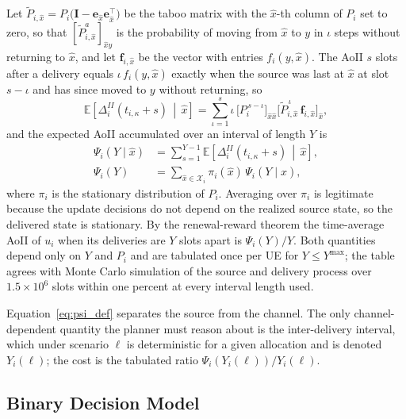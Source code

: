 Let $\tilde{P}_{i,\hat{x}}=P_i\bigl(\mathbf{I}-\mathbf{e}_{\hat{x}}\mathbf{e}_{\hat{x}}^{\top}\bigr)$ be the taboo
matrix with the $\hat{x}$-th column of $P_i$ set to zero, so that $[\tilde{P}_{i,\hat{x}}^{a}]_{\hat{x}y}$ is the
probability of moving from $\hat{x}$ to $y$ in $\iota$ steps without returning to $\hat{x}$, and let
$\mathbf{f}_{i,\hat{x}}$ be the vector with entries $f_i(y,\hat{x})$. The AoII $s$ slots after a delivery equals
$\iota\,f_i(y,\hat{x})$ exactly when the source was last at $\hat{x}$ at slot $s-\iota$ and has since moved to $y$
without returning, so
\begin{equation}
    \mathbb{E}\!\left[\Delta_i^{II}(t_{i,\kappa}+s)\,\middle|\,\hat{x}\right]
    =\sum_{\iota=1}^{s} \iota\,\bigl[P_i^{\,s-\iota}\bigr]_{\hat{x}\hat{x}}
    \bigl[\tilde{P}_{i,\hat{x}}^{\,\iota}\,\mathbf{f}_{i,\hat{x}}\bigr]_{\hat{x}},
    \label{eq:aoii_slot}
\end{equation}
and the expected AoII accumulated over an interval of length $Y$ is
\begin{align}
    \Psi_i(Y\mid\hat{x})&=\sum_{s=1}^{Y-1}
    \mathbb{E}\!\left[\Delta_i^{II}(t_{i,\kappa}+s)\,\middle|\,\hat{x}\right],
    \nonumber\\
    \Psi_i(Y)&=\sum_{\hat{x}\in\mathcal{X}_i}\pi_i(\hat{x})\,\Psi_i(Y\mid\hat{x}),
    \label{eq:psi_def}
\end{align}
where $\pi_i$ is the stationary distribution of $P_i$. Averaging over $\pi_i$ is legitimate because the update
decisions do not depend on the realized source state, so the delivered state is stationary. By the renewal-reward
theorem the time-average AoII of $u_i$ when its deliveries are $Y$ slots apart is $\Psi_i(Y)/Y$. Both quantities depend
only on $Y$ and $P_i$ and are tabulated once per UE for $Y\leq Y^{\max}$; the table agrees with Monte Carlo
simulation of the source and delivery process over $1.5\times 10^{6}$ slots within one percent at every interval length
used.

Equation~\eqref{eq:psi_def} separates the source from the channel. The only channel-dependent quantity the planner
must reason about is the inter-delivery interval, which under scenario $\ell$ is deterministic for a given allocation
and is denoted $Y_i(\ell)$; the cost is the tabulated ratio $\Psi_i(Y_i(\ell))/Y_i(\ell)$.

\subsection{Binary Decision Model}
\label{sec:binary}

